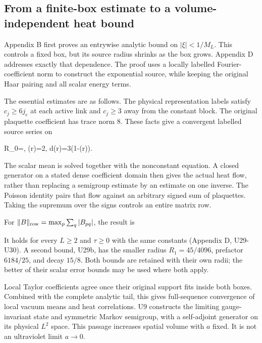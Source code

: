 \documentclass[11pt,a4paper]{article}
\renewcommand{\[}{\begingroup\small\originaldisplaystart}
\renewcommand{\]}{\originaldisplayend\endgroup}
\begin{document}
\subsection{From a finite-box estimate to a volume-independent heat
bound}\label{from-a-finite-box-estimate-to-a-volume-independent-heat-bound}

Appendix B first proves an entrywise analytic bound on \(|\xi|<1/M_L\).
This controls a fixed box, but its source radius shrinks as the box
grows. Appendix D addresses exactly that dependence. The proof uses a
locally labelled Fourier-coefficient norm to construct the exponential
source, while keeping the original Haar pairing and all scalar energy
terms.

The essential estimates are as follows. The physical representation
labels satisfy \(c_j\geq6j_e\) at each active link and \(c_j\geq3\) away
from the constant block. The original plaquette coefficient has trace
norm \(8\). These facts give a convergent labelled source series on

\[
R_0=,\qquad
\chi(r)=2,\qquad
d(r)=3(1-\chi(r)).
\]

The scalar mean is solved together with the nonconstant equation. A
closed generator on a stated dense coefficient domain then gives the
actual heat flow, rather than replacing a semigroup estimate by an
estimate on one inverse. The Poisson identity pairs that flow against an
arbitrary signed sum of plaquettes. Taking the supremum over the signs
controls an entire matrix row.

For \(\|B\|_{\rm row}=\max_p\sum_q|B_{pq}|\), the result is

\[
\]

It holds for every \(L\geq2\) and \(\tau\geq0\) with the same constants
(Appendix D, U29-U30). A second bound, U29b, has the smaller radius
\(R_1=45/4096\), prefactor \(6184/25\), and decay \(15/8\). Both bounds
are retained with their own radii; the better of their scalar error
bounds may be used where both apply.

Local Taylor coefficients agree once their original support fits inside
both boxes. Combined with the complete analytic tail, this gives
full-sequence convergence of local vacuum means and heat correlations.
U9 constructs the limiting gauge-invariant state and symmetric Markov
semigroup, with a self-adjoint generator on its physical \(L^2\) space.
This passage increases spatial volume with \(a\) fixed. It is not an
ultraviolet limit \(a\to0\).
\end{document}
